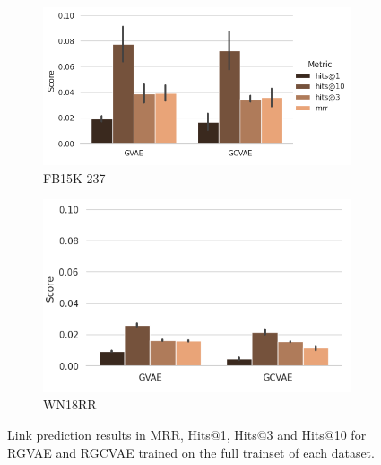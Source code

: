  \begin{figure}[H]
  \centering
  \begin{subfigure}{.5\textwidth}
    \left
    \includegraphics[height=.5\textwidth, keepaspectratio]{graphs/plots/lp_fb.png}
    \caption{FB15K-237}
    \label{fig5:lpfb}
  \end{subfigure}%
  \begin{subfigure}{.5\textwidth}
    \right
    \includegraphics[height=.5\textwidth]{graphs/plots/lp_wn_wol.png}
    \caption{WN18RR}
    \label{fig5:lpwn}
  \end{subfigure}
  \caption{Link prediction results in MRR, Hits@1, Hits@3 and Hits@10 for RGVAE and RGCVAE trained on the full trainset of each dataset.}
  \label{fig5:lp_final}
\end{figure}







